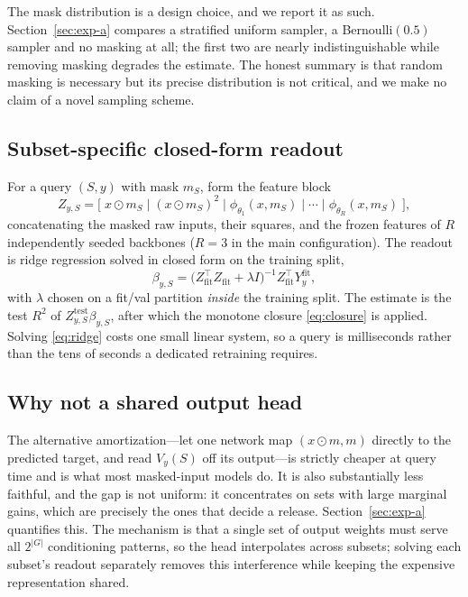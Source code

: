 \documentclass[preprint,12pt]{elsarticle}
\newcommand{\Vy}{V_{y}}
\newcommand{\Rtwo}{R^{2}}
\begin{document}
The mask distribution is a design choice, and we report it as such. Section~\ref{sec:exp-a}
compares a stratified uniform sampler, a Bernoulli$(0.5)$ sampler and no masking at all;
the first two are nearly indistinguishable while removing masking degrades the estimate.
The honest summary is that random masking is necessary but its precise distribution is not
critical, and we make no claim of a novel sampling scheme.

\subsection{Subset-specific closed-form readout}
For a query $(S,y)$ with mask $m_S$, form the feature block
\begin{equation}
Z_{y,S} = \big[\; x \odot m_S \;\big|\; (x \odot m_S)^{2} \;\big|\;
\phi_{\theta_1}(x,m_S) \;\big|\; \cdots \;\big|\; \phi_{\theta_R}(x,m_S) \;\big],
\end{equation}
concatenating the masked raw inputs, their squares, and the frozen features of $R$
independently seeded backbones ($R=3$ in the main configuration). The readout is ridge
regression solved in closed form on the training split,
\begin{equation}\label{eq:ridge}
\beta_{y,S} = \big(Z^{\top}_{\mathrm{fit}} Z_{\mathrm{fit}} + \lambda I\big)^{-1}
Z^{\top}_{\mathrm{fit}} Y^{\mathrm{fit}}_{y},
\end{equation}
with $\lambda$ chosen on a fit/val partition \emph{inside} the training split. The estimate
is the test $\Rtwo$ of $Z^{\mathrm{test}}_{y,S}\beta_{y,S}$, after which the monotone
closure \eqref{eq:closure} is applied. Solving \eqref{eq:ridge} costs one small linear
system, so a query is milliseconds rather than the tens of seconds a dedicated retraining
requires.

\subsection{Why not a shared output head}
The alternative amortization---let one network map $(x \odot m, m)$ directly to the
predicted target, and read $\Vy(S)$ off its output---is strictly cheaper at query time and
is what most masked-input models do. It is also substantially less faithful, and the gap is
not uniform: it concentrates on sets with large marginal gains, which are precisely the ones
that decide a release. Section~\ref{sec:exp-a} quantifies this. The mechanism is that a
single set of output weights must serve all $2^{|G|}$ conditioning patterns, so the head
interpolates across subsets; solving each subset's readout separately removes this
interference while keeping the expensive representation shared.
\end{document}
